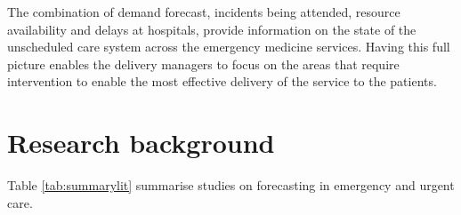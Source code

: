 \documentclass[]{elsarticle} %
\begin{document}
The combination of demand forecast, incidents being attended, resource availability and delays at hospitals, provide information on the state of the unscheduled care system across the emergency medicine services. Having this full picture enables the delivery managers to focus on the areas that require intervention to enable the most effective delivery of the service to the patients.

\hypertarget{lit}{%
\section{Research background}\label{lit}}

Table \ref{tab:summarylit} summarise studies on forecasting in emergency and urgent care.

\begin{table}[!h]


\end{table}
\end{document}
